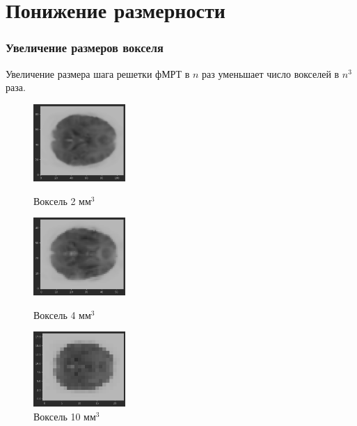 \documentclass{beamer}
\begin{document}
	\section{Понижение размерности}
	\begin{frame} 
		\frametitle{Увеличение размеров вокселя}
		
		Увеличение размера шага решетки фМРТ в $n$ раз уменьшает число вокселей в $n^3$ раза.
		\vspace{0.5cm}
										
			\begin{figure}
				\begin{minipage}{3.5cm}
					\includegraphics[width=3.5cm]{../images/downsampling2mm_1.png}
					\caption{Воксель 2 мм$^3$}
					\label{fg:6}
				\end{minipage}\hfill
				\begin{minipage}{3.5cm}
					\includegraphics[width=3.5cm]{../images/downsampling4mm_2.png}
					\caption{Воксель 4 мм$^3$}
					\label{fg:7}
				\end{minipage}\hfill
				\begin{minipage}{3.5cm}
					\includegraphics[width=3.5cm]{../images/downsampling10mm_3.png}
					\caption{Воксель 10 мм$^3$}
					\label{fg:8}
				\end{minipage}
			\end{figure}	
	\end{frame}
	
\end{document}
